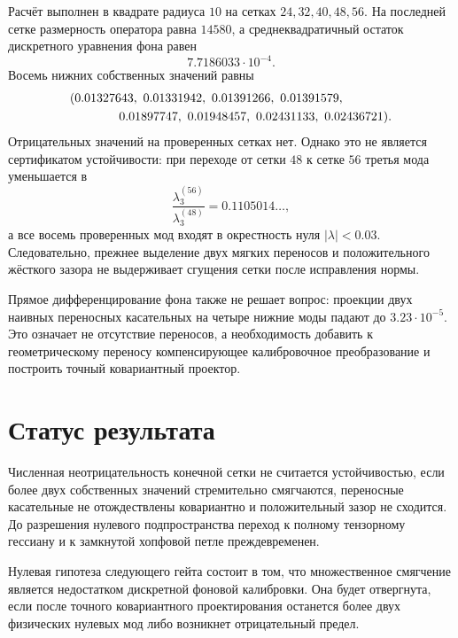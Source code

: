 Расчёт выполнен в квадрате радиуса $10$ на сетках
$24,32,40,48,56$. На последней сетке размерность оператора равна
$14580$, а среднеквадратичный остаток дискретного уравнения фона равен
\begin{equation}
 7.7186033\cdot10^{-4}.
\end{equation}
Восемь нижних собственных значений равны
\begin{equation}
\begin{split}
 &(0.01327643,\ 0.01331942,\ 0.01391266,\ 0.01391579,\\
 &\hspace{1.4cm}0.01897747,\ 0.01948457,\ 0.02431133,\ 0.02436721).
\end{split}
\end{equation}
Отрицательных значений на проверенных сетках нет. Однако это не является
сертификатом устойчивости: при переходе от сетки $48$ к сетке $56$
третья мода уменьшается в
\begin{equation}
 \frac{\lambda_3^{(56)}}{\lambda_3^{(48)}}
 =0.1105014\ldots,
\end{equation}
а все восемь проверенных мод входят в окрестность нуля $|\lambda|<0.03$.
Следовательно, прежнее выделение двух мягких переносов и положительного
жёсткого зазора не выдерживает сгущения сетки после исправления нормы.

Прямое дифференцирование фона также не решает вопрос: проекции двух
наивных переносных касательных на четыре нижние моды падают до
$3.23\cdot10^{-5}$. Это означает не отсутствие переносов, а
необходимость добавить к геометрическому переносу компенсирующее
калибровочное преобразование и построить точный ковариантный проектор.

\section{Статус результата}

\begin{nogocriterion}
Численная неотрицательность конечной сетки не считается устойчивостью,
если более двух собственных значений стремительно смягчаются, переносные
касательные не отождествлены ковариантно и положительный зазор не
сходится. До разрешения нулевого подпространства переход к полному
тензорному гессиану и к замкнутой хопфовой петле преждевременен.
\end{nogocriterion}

Нулевая гипотеза следующего гейта состоит в том, что множественное
смягчение является недостатком дискретной фоновой калибровки. Она будет
отвергнута, если после точного ковариантного проектирования останется
более двух физических нулевых мод либо возникнет отрицательный предел.

